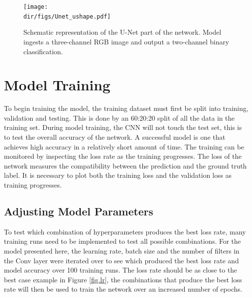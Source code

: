 \begin{figure}[htpb]
    \centering
    \texttt{[image: \\dir/figs/Unet\_ushape.pdf]}
    \caption[Schematic representation of the U-Net part of the network]{Schematic representation of the U-Net part of the network. Model ingests a three-channel RGB image and output a two-channel binary classification.}
    \label{fig.unet_large}
\end{figure}


\section{Model Training}\label{sec.model_training}
To begin training the model, the training dataset must first be split into training, validation and testing. This is done by an 60:20:20 split of all the data in the training set. During model training, the CNN will not touch the test set, this is to test the overall accuracy of the network. A successful model is one that achieves high accuracy in a relatively short amount of time. The training can be monitored by inspecting the loss rate as the training progresses. The loss of the network measures the compatibility between the prediction and the ground truth label. It is necessary to plot both the training loss and the validation loss as training progresses.  


\subsection{Adjusting Model Parameters}
To test which combination of hyperparameters produces the best loss rate, many training runs need to be implemented to test all possible combinations. For the model presented here, the learning rate, batch size and the number of filters in the Conv layer were iterated over to see which produced the best loss rate and model accuracy over 100 training runs. The loss rate should be as close to the best case example in Figure \ref{fig.lr}, the combinations that produce the best loss rate will then be used to train the network over an increased number of epochs.

